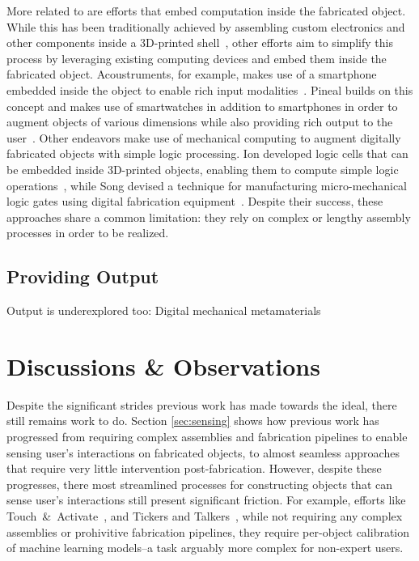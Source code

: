       More related to \al are efforts that embed computation inside the
      fabricated object. While this has been traditionally achieved by
      assembling custom electronics and other components inside a
      3D-printed shell~\cite{Murray-Smith:2008}, other efforts aim to
      simplify this process by leveraging existing computing devices and
      embed them inside the fabricated object. Acoustruments, for
      example, makes use of a smartphone embedded inside the object to
      enable rich input modalities~\cite{Laput:2015}. Pineal builds on
      this concept and makes use of smartwatches in addition to
      smartphones in order to augment objects of various dimensions while
      also providing rich output to the user~\cite{Ledo:2017}. Other
      endeavors make use of mechanical computing to augment digitally
      fabricated objects with simple logic processing. Ion \etal
      developed logic cells that can be embedded inside 3D-printed
      objects, enabling them to compute simple logic
      operations~\cite{Ion:2017}, while Song \etal devised a technique
      for manufacturing micro-mechanical logic gates using digital
      fabrication equipment~\cite{Song:2019}. Despite their success,
      these approaches share a common limitation: they rely on complex or
      lengthy assembly processes in order to be realized.

    \subsection{Providing Output} \label{sec:output}
    Output is underexplored too: Digital mechanical metamaterials

  \section{Discussions \& Observations}
    Despite the significant strides previous work has made towards the \papf
    ideal, there still remains work to do. Section \ref{sec:sensing} shows how
    previous work has progressed from requiring complex assemblies and
    fabrication pipelines to enable sensing user's interactions on fabricated
    objects, to almost seamless approaches that require very little intervention
    post-fabrication. However, despite these progresses, there most streamlined
    processes for constructing objects that can sense user's interactions still
    present significant friction. For example, efforts like
    Touch~\&~Activate~\cite{}, and Tickers and Talkers~\cite{}, while not
    requiring any complex assemblies or prohivitive fabrication pipelines, they
    require per-object calibration of machine learning models--a task arguably
    more complex for non-expert users.

